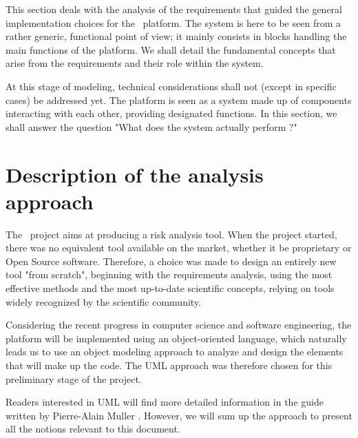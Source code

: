 
This section deals with the analysis of the requirements that guided the general implementation choices for the \OT\ platform. The system is here to be seen from a rather generic, functional point of view; it mainly consists in blocks handling the main functions of the platform. We shall detail the fundamental concepts that arise from the requirements and their role within the system.

At this stage of modeling, technical considerations shall not (except in specific cases) be addressed yet. The platform is seen as a system made up of components interacting with each other, providing designated functions. In this section, we shall answer the question "What does the system actually perform ?"

\section{Description of the analysis approach}

The \OT\ project aims at producing a risk analysis tool. When the project started, there was no equivalent tool available on the market, whether it be proprietary or Open Source software. Therefore, a choice was made to design an entirely new tool "from scratch", beginning with the requirements analysis, using the most effective methods and the most up-to-date scientific concepts, relying on tools widely recognized by the scientific community.

Considering the recent progress in computer science and software engineering, the platform will be implemented using an object-oriented language, which naturally leads us to use an object modeling approach to analyze and design the elements that will make up the code. The UML approach was therefore chosen for this preliminary stage of the project.

Readers interested in UML will find more detailed information in the guide written by Pierre-Alain Muller \cite{UML}. However, we will sum up the approach to present all the notions relevant to this document.

